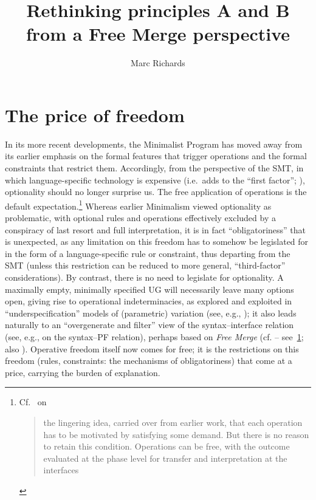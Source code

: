 \documentclass[output=paper]{langsci/langscibook}
\author{Marc Richards\affiliation{Queen's University Belfast}}
\title{Rethinking principles A and B from a Free Merge perspective}
\begin{document}
\glsresetall

\section{The price of freedom}\label{sec:22.1}

In its more recent developments, the Minimalist Program has moved away from its
earlier emphasis on the formal features that trigger operations and the formal
constraints that restrict them. Accordingly, from the perspective of the
\gls{SMT}, in which language-specific technology is expensive (i.e.\ adds to
the \enquote{first factor}; \citealt{Chomsky2005}), optionality should no
longer surprise us. The free application of operations is the default
expectation.\footnote{Cf.\ \citet[10--11]{Chomsky2015} on \blockquote{the
        lingering idea, carried over from earlier work, that each operation has
        to be motivated by satisfying some demand.  But there is no reason to
        retain this condition.  Operations can be free, with the outcome
evaluated at the phase level for transfer and interpretation at the
interfaces}.\label{fn:22.1}} Whereas earlier Minimalism \citep{Chomsky1995}
viewed optionality as problematic, with optional rules and operations
effectively excluded by a conspiracy of last resort and full interpretation, it
is in fact \enquote{obligatoriness} that is unexpected, as any limitation on
this freedom has to somehow be legislated for in the form of a
language-specific rule or constraint, thus departing from the \gls{SMT} (unless
this restriction can be reduced to more general, \enquote{third-factor}
considerations). By contrast, there is no need to legislate for optionality. A
maximally empty, minimally specified \gls{UG} will necessarily
leave many options open, giving rise to operational indeterminacies, as
explored and exploited in \enquote{underspecification} models of (parametric)
variation (see, e.g.,
\citealt{Uriagereka1994,BibRich2006,BerCho2011,Richards2008b,Kandybowicz2009,Boeckx2011b,RobHol2010});
it also leads naturally to an \enquote{overgenerate and filter} view of the
syntax--interface relation (see, e.g., \citealt{Richards2004,Richards2007b} on the
syntax--\gls{PF} relation), perhaps based on \emph{Free Merge} (cf.
\citealt{Chomsky2007,Chomsky2008,Chomsky2013,Chomsky2015} --
see~\cref{fn:22.1}; also \citealt{Boeckx2011b}). Operative freedom itself now
comes for free; it is the restrictions on this freedom (rules, constraints: the
mechanisms of obligatoriness) that come at a price, carrying the burden of
explanation.
\end{document}
